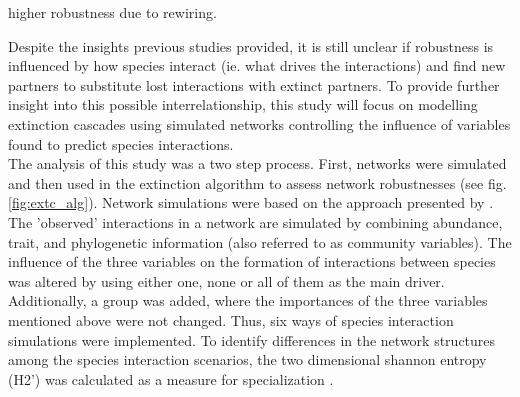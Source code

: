 \documentclass[12pt,a4paper]{article}
\begin{document}
\parencite{Kaiser-Bunbury2010, Schleuning2016, Timoteo2016, Costa2018} higher robustness due to rewiring. %



Despite the insights previous studies provided, it is still unclear if robustness is influenced by how species interact (ie. what drives the interactions) and find new partners to substitute lost interactions with extinct partners. To provide further insight into this possible interrelationship, this study will focus on modelling extinction cascades using simulated networks controlling the influence of variables found to predict species interactions.\\


The analysis of this study was a two step process. First, networks were simulated and then used in the extinction algorithm to assess network robustnesses (see fig. \ref{fig:extc_alg}).  
Network simulations were based on the approach presented by \citeauthor{Benadi} \parencite{Benadi}. The 'observed' interactions in a network are simulated by combining abundance, trait, and phylogenetic information (also referred to as community variables). The influence of the three variables on the formation of interactions between species was altered by using either one, none or all of them as the main driver. Additionally, a group was added, where the importances of the three variables mentioned above were not changed. Thus, six ways of species interaction simulations were implemented.
To identify differences in the network structures among the species interaction scenarios, the two dimensional shannon entropy (H2') was calculated as a measure for specialization \parencite{Bluethgen2006}.



	
\end{document}
